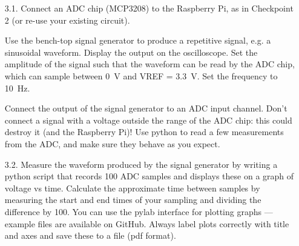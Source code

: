 \begin{enumerate}

\item [3.1.] Connect an ADC chip (MCP3208) to the Raspberry Pi, as in Checkpoint 2 (or re-use your existing circuit).

Use the bench-top signal generator to produce a repetitive signal, e.g. a sinusoidal waveform.
Display the output on the oscilloscope.
Set the amplitude of the signal such that the waveform can be read by the ADC chip, which can sample between 0~V and VREF = 3.3~V. Set the frequency to 10~Hz.

Connect the output of the signal generator to an ADC input channel.
Don't connect a signal with a voltage outside the range of the ADC chip: this could destroy it (and the Raspberry Pi)!
Use python to read a few measurements from the ADC, and make sure they behave as you expect.


\item [3.2.] Measure the waveform produced by the signal generator by writing a python script that records 100 ADC samples and displays these on a graph of voltage vs time.
Calculate the approximate time between samples by measuring the start and end times of your sampling and dividing the difference by 100.
You can use the pylab interface for plotting graphs --- example files are available on GitHub.
Always label plots correctly with title and axes and save these to a file (pdf format).




\end{enumerate}
